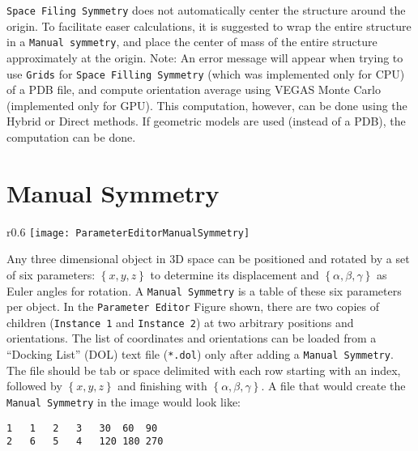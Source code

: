 \documentclass[../D+Manual.tex]{subfiles}
\begin{document}
\texttt{Space Filing Symmetry} does not automatically center the structure around the origin. To facilitate easer calculations, it is suggested to wrap the entire structure in a \texttt{Manual symmetry}, and place the center of mass of the entire structure approximately at the origin.
Note: An error message will appear when trying to use \texttt{Grids} for \texttt{Space Filling Symmetry} (which was implemented only for CPU) of a PDB file, and compute orientation average using VEGAS Monte Carlo (implemented only for GPU). This computation, however, can be done using the Hybrid or Direct methods. If geometric models are used (instead of a PDB), the computation can be done.






  
\section{Manual Symmetry}
\label{sec:ManualSymmetry}

\begin{wrapfigure}{r}{0.6\textwidth}
	\vspace{-15pt}
	\centering
    \texttt{[image: ParameterEditorManualSymmetry]}
\end{wrapfigure}



Any three dimensional object in 3D space can be positioned and rotated by a set of six parameters: $\left\lbrace x,y,z\right\rbrace$ to determine its displacement and $\left\lbrace\alpha, \beta, \gamma\right\rbrace$ as Euler angles for rotation. A \texttt{Manual Symmetry} is a table of these six parameters per object. In the \texttt{Parameter Editor} Figure shown, there are two copies of children (\texttt{Instance 1} and \texttt{Instance 2}) at two arbitrary positions and orientations. The list of coordinates and orientations can be loaded from a ``Docking List'' (DOL) text file (\texttt{*.dol}) only after adding a \texttt{Manual Symmetry}. The file should be tab or space delimited with each row starting with an index, followed by $\left\lbrace x,y,z\right\rbrace$ and finishing with $\left\lbrace \alpha, \beta, \gamma\right\rbrace$. A file that would create the \texttt{Manual Symmetry} in the image would look like:

\begin{lstlisting}[basicstyle=\small,breaklines=false,backgroundcolor=\color{gray!15}]
1	1	2	3	30	60	90
2	6	5	4	120	180	270
\end{lstlisting}
\end{document}
